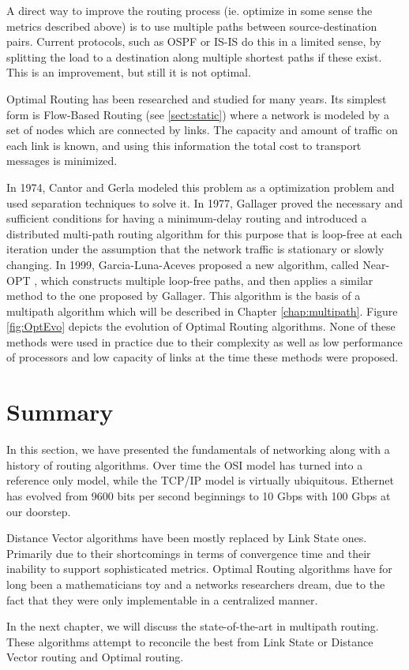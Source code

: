 A direct way to improve the routing process (ie. optimize in some sense the metrics described above) is to use multiple paths between source-destination pairs. Current protocols, such as OSPF \cite{OSPF} or IS-IS \cite{RFC3787} do this in a limited sense, by splitting the load to a destination along multiple shortest paths if these exist. This is an improvement, but still it is not optimal.


Optimal Routing has been researched and studied for many years. Its simplest form is Flow-Based Routing (see \ref{sect:static}) where a network is modeled by a set of nodes which are connected by links. The capacity and amount of traffic on each link is known, and using this information the total cost to transport messages is minimized.

 In 1974, Cantor and Gerla \cite{CANTOR74} modeled this problem as a optimization problem and used separation techniques to solve it. In 1977, Gallager \cite{Gallager-mindelay} proved the necessary and sufficient conditions for having a minimum-delay routing and introduced a distributed multi-path routing algorithm for this purpose that is loop-free at each iteration under the assumption that the network traffic is stationary or slowly changing. In 1999, Garcia-Luna-Aceves proposed a new algorithm, called Near-OPT \cite{NearOPT}, which constructs multiple loop-free paths, and then applies a similar method to the one proposed by Gallager. This algorithm is the basis of a multipath algorithm which will be described in Chapter \ref{chap:multipath}.
 Figure \ref{fig:OptEvo} depicts the evolution of Optimal Routing algorithms. None of these methods were used in practice due to their complexity as well as low performance of processors and low capacity of links at the time these methods were proposed.


\section{Summary}

In this section, we have presented the fundamentals of networking along with a history of routing algorithms. Over time the OSI model has turned into a reference only model, while the TCP/IP model is virtually ubiquitous. Ethernet has evolved from 9600 bits per second beginnings to 10 Gbps with 100 Gbps at our doorstep.

Distance Vector algorithms have been mostly replaced by Link State ones. Primarily due to their shortcomings in terms of convergence time and their inability to support sophisticated metrics. Optimal Routing algorithms have for long been a mathematicians toy and a networks researchers dream, due to the fact that they were only implementable in a centralized manner.

In the next chapter, we will discuss the state-of-the-art in multipath routing. These algorithms attempt to reconcile the best from Link State or Distance Vector routing and Optimal routing. 
